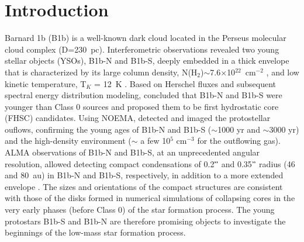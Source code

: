 \documentclass[letter]{aa}
\begin{document}

   \maketitle
%

\section{Introduction}


Barnard 1b (B1b) is a well-known dark cloud
located in the Perseus molecular cloud complex (D=230~pc).
Interferometric observations revealed two young stellar objects (YSOs), B1b-N and B1b-S, 
deeply embedded in a thick envelope \citep{Huang13} that is characterized by its large 
column density, 
N(H$_2$)$\sim$7.6$\times$10$^{22}$~cm$^{-2}$ \citep{Daniel13}, and low kinetic 
temperature, T$_K$ = 12~K \citep{Lis10}.
Based on Herschel fluxes and subsequent spectral energy distribution modeling, \citet{Pezzuto12} 
concluded that B1b-N and  B1b-S were younger than Class 0 sources and proposed 
them to be first hydrostatic core (FHSC) candidates. Using NOEMA, 
\citet{Gerin15} detected and imaged the protostellar ouflows, confirming the young ages
of B1b-N and B1b-S ($\sim$1000 yr and $\sim$3000 yr) and the high-density
environment ($\sim$ a few 10$^5$ cm$^{-3}$ for the outflowing gas). 
ALMA observations of B1b-N and B1b-S, at an unprecedented angular resolution, 
allowed detecting compact condensations of 0.2$"$ and 0.35$"$ radius 
(46 and 80~au) in B1b-N and B1b-S, respectively, in addition
to a more extended envelope \citep{Gerin16}. The sizes and orientations of 
the compact structures are consistent with those of the disks formed in numerical simulations 
of collapsing cores \citep{Gerin16} in the very early phases (before Class 0) of
the star formation process. The young protostars B1b-S and B1b-N are therefore 
promising objects to investigate the beginnings of the low-mass star formation process. 
\end{document}

